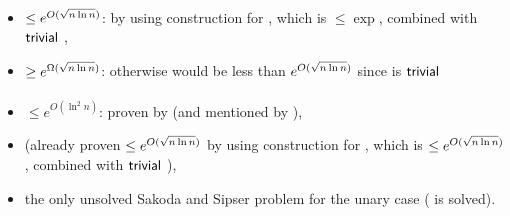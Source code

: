 \paragraph{\TNFA{}\tto\ONFA}
\begin{itemize}
	\item $\le e^{O(\sqrt{n\ln n})}$: by using construction for \hyperref[cost:2NFAto1DFAu]{\TNFA{}\tto\ODFA}, which is $\le\exp$, combined with $\mathsf{trivial}$ \ODFA{}\tto\ONFA,
	\item $\ge e^{\Omega(\sqrt{n\ln n})}$: otherwise \hyperref[cost:2DFAto1NFAu]{\TDFA{}\tto\ONFA} would be less than $e^{O(\sqrt{n\ln n})}$ since \TDFA{}\tto\TNFA is $\mathsf{trivial}$
\end{itemize}
\paragraph{\TNFA{}\tto\TDFA}\label{cost:2NFAto2DFAu}
\begin{itemize}
	\item $\le e^{O(\ln^2n)}$: proven by  (and mentioned by ),
	\item (already proven $\le e^{O(\sqrt{n\ln n})}$ by using construction for \hyperref[cost:2NFAto1DFAu]{\TNFA{}\tto\ODFA}, which is $\le e^{O(\sqrt{n\ln n})}$, combined with $\mathsf{trivial}$ \ODFA{}\tto\TDFA),
	\item the only unsolved Sakoda and Sipser problem for the unary case (\hyperref[cost:1NFAto2DFAu]{\ONFA{}\tto\TDFA} is solved).
\end{itemize}


